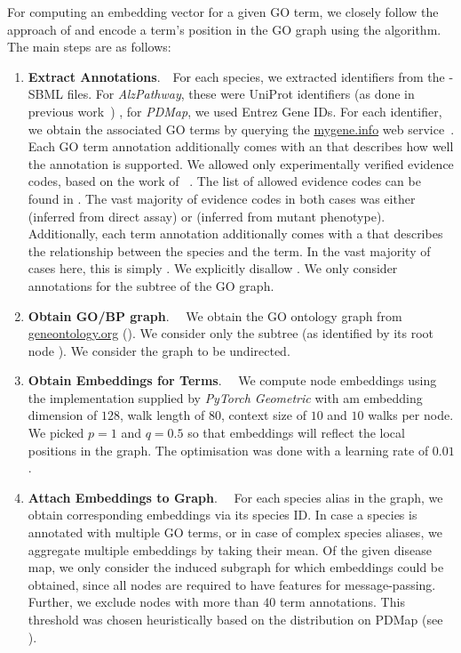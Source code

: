 \documentclass[
	fontsize=10pt, %
	twoside=true, %
	secnumdepth=1, %
  toc=indentunnumbered %
]{kaobook}
\begin{document}
For computing an embedding vector for a given GO term, we closely follow the
approach of \citeauthor{zhong_GO2VecTransformingGO_2020}
\cite{zhong_GO2VecTransformingGO_2020} and encode a term's position in the GO
graph using the  algorithm. The main steps are as follows:
\begin{enumerate}
\item \textbf{Extract Annotations}.~~For each species, we extracted identifiers
  from the -SBML files. For \textit{AlzPathway}, these
  were UniProt identifiers (as done in previous
  work~\cite{ostaszewski_ClusteringApproachesVisual_2018}) , for \textit{PDMap},
  we used Entrez Gene IDs.
%
  For each identifier, we obtain the associated GO terms by querying the
  \href{https://mygene.info/}{mygene.info} web
  service~\cite{xin_HighperformanceWebServices_2016}. Each GO term annotation
  additionally comes with an  that describes how well the
  annotation is supported. We allowed only experimentally verified evidence
  codes, based on the work of
  \citeauthor{ruiz_identification_2021}~\cite{ruiz_identification_2021}. The
  list of allowed evidence codes can be found in . The
  vast majority of evidence codes in both cases was either  (inferred
  from direct assay) or  (inferred from mutant phenotype).
%
  Additionally, each term annotation additionally comes with a 
  that describes the relationship between the species and the term. In the vast
  majority of cases here, this is simply . We explicitly
  disallow .
%
  We only consider annotations for the  subtree of the
  GO graph. 
%
\item \textbf{Obtain GO/BP graph}.~~ We obtain the GO ontology graph from
  \href{http://geneontology.org/docs/download-ontology/}{geneontology.org}
  (). We consider only the  subtree (as
  identified by its root node ). We consider the graph to be undirected.
%
\item \textbf{Obtain Embeddings for Terms}.~~ We compute node embeddings using
  the  implementation supplied by \textit{PyTorch Geometric} with
  am embedding dimension of $128$, walk length of $80$, context size of $10$ and 
  $10$ walks per node. We picked $p=1$ and $q=0.5$ so that embeddings will reflect
  the local positions in the graph. The optimisation was done with a learning
  rate of $0.01$.
\item \textbf{Attach Embeddings to Graph}.~~ For each species alias in the
  graph, we obtain corresponding embeddings via its species ID. In case a
  species is annotated with multiple GO terms, or in case of complex species
  aliases, we aggregate multiple embeddings by taking their mean. Of the given
  disease map, we only consider the induced subgraph for which embeddings could
  be obtained, since all nodes are required to have features for
  message-passing. Further, we exclude nodes with more than $40$ term
  annotations. This threshold was chosen heuristically based on the distribution
  on PDMap (see ).
 \end{enumerate}
\end{document}
